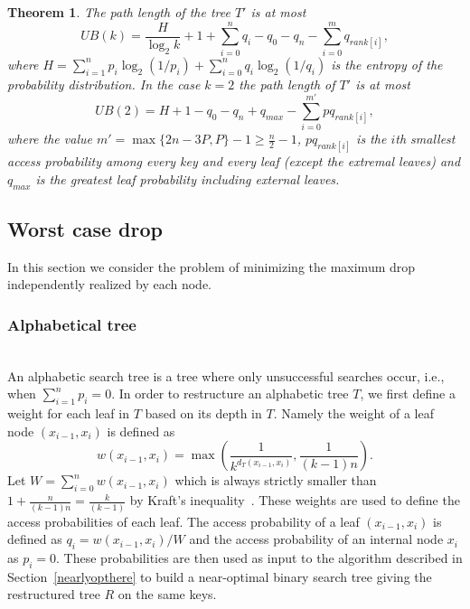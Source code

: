 \documentclass{llncs}\usepackage[english]{babel}
\newtheorem{thm}{Theorem}
\begin{document}
\begin{thm}
\label{UB-WADS}
The path length of the tree ${T'}$ is at most
\vspace{-0.2cm}
$$UB(k)=\frac{H}{\log_2 k}+1+\sum_{i=0}^n q_i - q_0 -q_n- \sum_{i=0}^m q_{rank[i]}, $$ 
where $H=\sum_{i=1}^n p_i \log_2 (1/p_i) + \sum_{i=0}^n q_i \log_2 (1/q_i)$ is the entropy of the probability distribution.  In the case $k=2$ the path length of ${T'}$ is at most
\vspace{-0.2cm}
$$
UB(2)=H+ 1- q_0 -q_n+q_{max}- \sum_{i=0}^{m'} pq_{rank[i]},
$$
where the value $m'=\max\{2n-3P,P\}-1\geq \frac{n}{2}-1$, $pq_{rank[i]}$ is the $i$th smallest access probability among every key and every leaf (except the extremal leaves) and $q_{max}$ is the greatest leaf probability including external leaves.
\end{thm}

\subsection{Worst case drop}
\label{worstcasesection}
In this section we consider the problem of minimizing the maximum drop independently realized by each node.
\subsubsection{Alphabetical tree}
~\\An alphabetic search tree is a tree where only unsuccessful searches occur, i.e., when $\sum_{i=1}^n p_i=0$. In order to restructure an alphabetic tree $T$, we first define a weight for each leaf in $T$ based on its depth in $T$. Namely the weight of a leaf node $(x_{i-1},x_i)$ is defined as
\vspace{-0.2cm}
$$
w(x_{i-1},x_i)=\max \left( \frac{1}{k^{d_T(x_{i-1},x_i)}},\frac{1}{(k-1)n} \right).
$$
Let $W=\sum_{i=0}^{n}w(x_{i-1},x_i)$ which is always strictly smaller than $1+\frac{n}{(k-1)n}=\frac{k}{(k-1)}$ by Kraft's inequality~\cite{Kraft}. These weights are used to define the access probabilities of each leaf. The access probability of a leaf $(x_{i-1},x_i)$ is defined as $q_i=w(x_{i-1},x_i)/W$ and the access probability of an internal node $x_i$ as $p_i=0$. These probabilities are then used as input to the algorithm described in Section~\ref{nearlyopthere} to build a near-optimal binary search tree giving the restructured tree $R$ on the same keys. 
\end{document}
